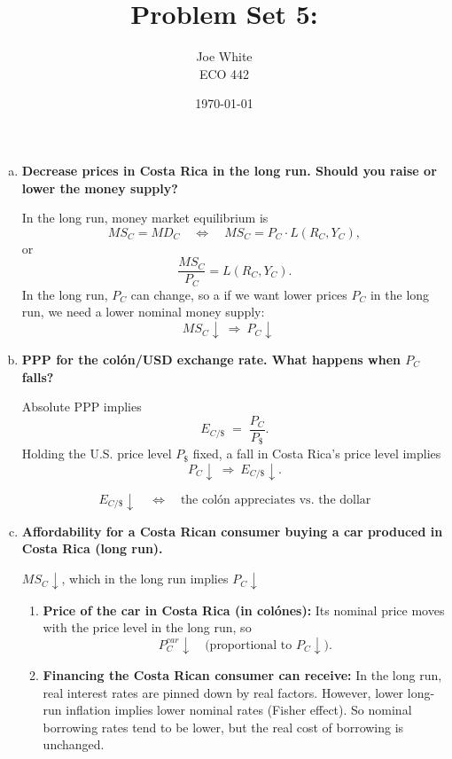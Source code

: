 \documentclass[11pt]{article}
\newcommand{\usd}{\text{\$}}
\newenvironment{problem}[2][Problem]{\begin{trivlist}
\item[\hskip \labelsep {\bfseries #1}\hskip \labelsep {\bfseries #2.}]
\leavevmode\par
}{\end{trivlist}}
\begin{document}
\title{Problem Set 5:}
\author{Joe White\\ECO 442}
\date{\today}
\maketitle

\begin{problem}{1}

\vspace{0.5em}
\begin{enumerate}[(a)]
\item \textbf{Decrease prices in Costa Rica in the long run. Should you raise or lower the money supply?}

In the long run, money market equilibrium is
\[
MS_C = MD_C
\quad\Longleftrightarrow\quad
MS_C = P_C \cdot L(R_C, Y_C),
\]
or
\[
\frac{MS_C}{P_C} = L(R_C, Y_C).
\]
In the long run, $P_C$ can change, so a if we want lower prices $P_C$ in the long run, we need a lower nominal money supply:
\[
MS_C \downarrow \ \Rightarrow\ P_C \downarrow \quad
\]

\item \textbf{PPP for the col\'on/USD exchange rate. What happens when $P_C$ falls?}

Absolute PPP implies
\[
E_{C/\usd} \;=\; \frac{P_C}{P_{\usd}}.
\]
Holding the U.S. price level $P_{\usd}$ fixed, a fall in Costa Rica's price level implies
\[
P_C \downarrow \ \Rightarrow\ E_{C/\usd} \downarrow.
\]

\[
E_{C/\usd}\downarrow \quad\Longleftrightarrow\quad \text{the col\'on appreciates vs.\ the dollar}
\]

\item \textbf{Affordability for a Costa Rican consumer buying a car produced in Costa Rica (long run).}

$MS_C\downarrow$, which in the long run implies $P_C\downarrow$

\begin{enumerate}[(1)]
\item \textbf{Price of the car in Costa Rica (in col\'ones):} Its nominal price moves with the price level in the long run, so
\[
P^{car}_C \downarrow \quad \text{(proportional to } P_C\downarrow\text{).}
\]

\item \textbf{Financing the Costa Rican consumer can receive:}
In the long run, real interest rates are pinned down by real factors. However, lower long-run inflation implies lower nominal rates (Fisher effect). So nominal borrowing rates tend to be lower, but the real cost of borrowing is unchanged.


\end{enumerate}
\end{enumerate}
\end{problem}
\end{document}
